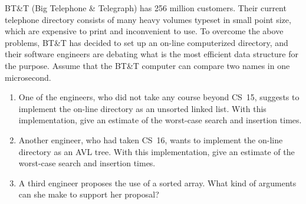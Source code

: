 BT\&T  (Big Telephone \&  Telegraph) has 256 million customers.  Their
current telephone directory consists of many heavy volumes typeset in
small point size, which are expensive to print and inconvenient to
use.  To overcome the above problems, BT\&T  has decided to set up an
on-line computerized directory, and their software engineers are
debating what is the most efficient data structure for the purpose.
Assume that the BT\&T  computer can compare two names in one
microsecond.

\begin{enumerate}

\item  One of the engineers, who did not take any course beyond CS~15,
suggests to implement the on-line directory as an unsorted linked
list.  With this implementation, give an estimate of the worst-case
search and insertion times.

\item  Another engineer, who had taken CS~16, wants to implement the
on-line directory as an AVL tree.  With this implementation, give an
estimate of the worst-case search and insertion times.

\item  A third engineer proposes the use of a sorted array.  What kind
of arguments can she make to support her proposal?

\end{enumerate}
